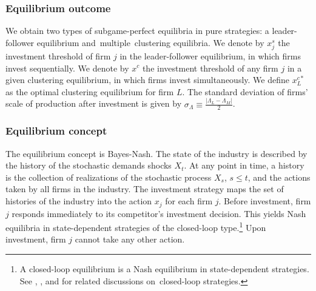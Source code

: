 \documentclass[nogrid,nosurname,sort&compress]{RFS}
\begin{document}

\subsubsection{Equilibrium outcome}

We obtain two types of subgame-perfect equilibria in pure strategies: a leader-follower
equilibrium and\ multiple\ clustering equilibria. We denote by $x_{j}^{s}$ the investment
threshold of firm $j$ in the leader-follower equilibrium, in which firms invest sequentially. We
denote by $x^{c}$ the investment threshold of any firm $j$ in a given clustering equilibrium, in
which firms invest simultaneously. We define $x_{L}^{c\ast }$ as the optimal clustering
equilibrium for firm $L$. The standard deviation of firms' scale of production after investment is
given by $\sigma _{\Lambda }\equiv \frac{\left\vert \Lambda _{L}-\Lambda _{M}\right\vert
}{2}$.

\subsubsection{Equilibrium concept}

The equilibrium concept is Bayes-Nash. The state of the industry is described by the history of
the stochastic demands shocks $X_{t}$. At any point in time, a history is the collection of
realizations of the stochastic process $X_{s}$, $s\leq t$, and the actions taken by all firms in
the industry. The investment strategy maps the set of histories of the industry into the action
$x_{j}$ for each firm $j$. Before investment, firm $j$ responds immediately to its competitor's
investment decision. This yields Nash equilibria in state-dependent strategies of the
closed-loop type.\footnote{A closed-loop equilibrium is a Nash equilibrium in state-dependent
strategies. See \cite{fudenberg1991}, \cite{weeds2002}, and \cite{back} for related discussions
on\ closed-loop strategies.} Upon investment, firm $j$ cannot take any other action.
\end{document}
